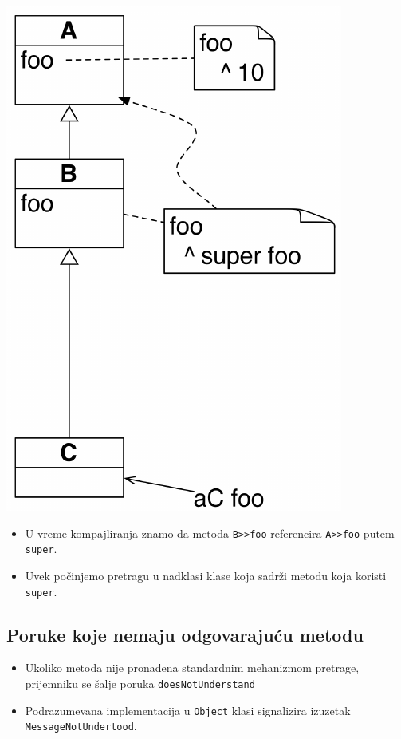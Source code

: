 \documentclass[presentation]{beamer}
\begin{document}
\begin{center}
\includegraphics[width=.9\linewidth]{./slike/super_static.png}
\end{center}
\begin{itemize}
\item U vreme kompajliranja znamo da metoda \texttt{B>>foo} referencira \texttt{A>>foo} putem \texttt{super}.
\item Uvek počinjemo pretragu u nadklasi klase koja sadrži metodu koja koristi \texttt{super}.
\end{itemize}

\subsection{Poruke koje nemaju odgovarajuću metodu}
\label{sec:orge18e086}

\begin{itemize}
\item Ukoliko metoda nije pronađena standardnim mehanizmom pretrage, prijemniku se
šalje poruka \texttt{doesNotUnderstand}
\item Podrazumevana implementacija u \texttt{Object} klasi signalizira izuzetak
\texttt{MessageNotUndertood}.
\end{itemize}
\end{document}
